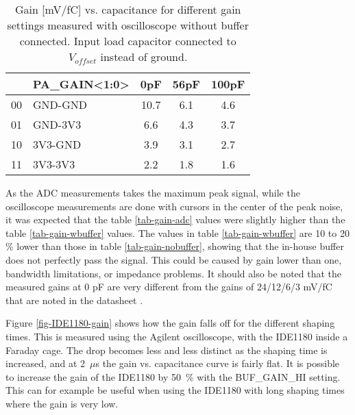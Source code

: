 \documentclass[../main/thesis.tex]{subfiles}
\begin{document}
\begin{table}[h!]
	\begin{center}
		\caption{Gain [mV/fC] vs. capacitance for different gain settings measured with oscilloscope without buffer connected. Input load capacitor connected to $V_{offset}$ instead of ground.}
		\label{tab-gain-nobuffer-offset}
		\begin{tabular}{clccc}\toprule
			&\textbf{PA\_GAIN<1:0>} & \textbf{0pF}  & \textbf{56pF} & \textbf{100pF} \\ \midrule
			00&GND-GND     & 10.7 & 6.1  & 4.6  \\
			01&GND-3V3     & 6.6  & 4.3  & 3.7   \\
			10&3V3-GND     & 3.9 & 3.1 & 2.7   \\
			11&3V3-3V3     & 2.2 & 1.8 & 1.6   \\ \bottomrule
		\end{tabular}
	\end{center}
\end{table}

As the ADC measurements takes the maximum peak signal, while the oscilloscope measurements are done with cursors in the center of the peak noise, it was expected that the table \ref{tab-gain-adc} values were slightly higher than the table \ref{tab-gain-wbuffer} values. The values in table \ref{tab-gain-wbuffer} are 10 to 20 \% lower than those in table \ref{tab-gain-nobuffer}, showing that the in-house buffer does not perfectly pass the signal. This could be caused by gain lower than one, bandwidth limitations, or impedance problems. It should also be noted that the measured gains at 0 pF are very different from the gains of 24/12/6/3 mV/fC that are noted in the datasheet \citep{IDE1180}. 



Figure \ref{fig-IDE1180-gain} shows how the gain falls off for the different shaping times. This is measured using the Agilent oscilloscope, with the IDE1180 inside a Faraday cage. The drop becomes less and less distinct as the shaping time is increased, and at 2~$\mu$s the gain vs. capacitance curve is fairly flat. It is possible to increase the gain of the IDE1180 by 50~\% with the BUF\_GAIN\_HI setting. This can for example be useful when using the IDE1180 with long shaping times where the gain is very low.
\end{document}
